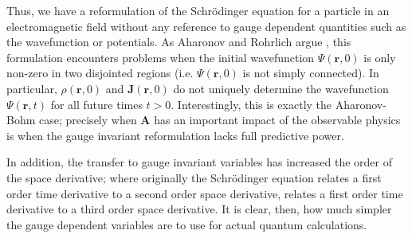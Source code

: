 Thus, we have a reformulation of the Schr\"odinger equation for a particle in an
electromagnetic field without any reference to gauge dependent quantities such
as the wavefunction or potentials. As Aharonov and Rohrlich argue
\cite{aharonov-rohrlich}, this formulation encounters problems when the initial
wavefunction $\Psi(\mathbf{r}, 0)$ is only non-zero in two disjointed regions
(i.e. $\Psi(\mathbf{r}, 0)$ is not simply connected). In particular,
$\rho(\mathbf{r}, 0)$ and $\mathbf{J}(\mathbf{r}, 0)$ do not uniquely determine
the wavefunction $\Psi(\mathbf{r}, t)$ for all future times $t > 0$.
Interestingly, this is exactly the Aharonov-Bohm case; precisely when
$\mathbf{A}$ has an important impact of the observable physics is when the gauge
invariant reformulation lacks full predictive power.

In addition, the transfer to gauge invariant variables has increased the order
of the space derivative; where originally the Schr\"odinger equation relates a
first order time derivative to a second order space derivative,
 relates a first order time derivative to a third order space
derivative. It is clear, then, how much simpler the gauge dependent variables
are to use for actual quantum calculations.
